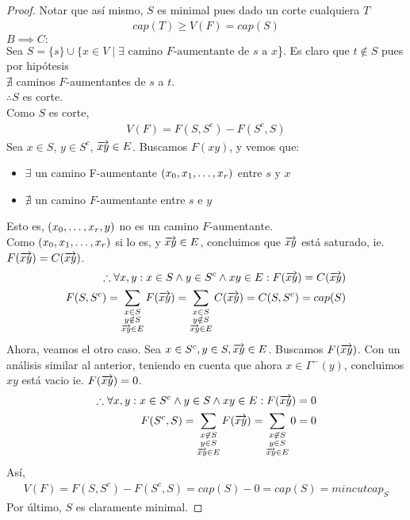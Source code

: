 \begin{proof}
  Notar que así mismo, $S$ es minimal pues dado un corte cualquiera $T$\begin{align}
    cap(T) \ge V(F) = cap(S)
  \end{align}
  $B \implies C:$\\
  Sea $S = \{s\} \cup \{x \in V \mid \exists \text{ camino $F$-aumentante de $s$ a $x$}$\}.
  Es claro que $t \notin S$ pues por hipótesis \\$\nexists$ caminos $F$-aumentantes de $s$ a $t$.\\
  $\therefore S$ es corte.\\
  Como $S$ es corte,
  \begin{align}
    V(F) = F(S, S^c) - F(S^c, S)
  \end{align}
  Sea $x \in S$, $y \in S^c$, $\overrightarrow{xy} \in E$. Buscamos $F(xy)$, y vemos que:
  \begin{itemize}
  \item $\exists$ un camino F-aumentante $(x_0, x_1,\mathellipsis, x_r)$ entre $s$ y $x$
  \item $\nexists$ un camino $F$-aumentante entre $s$ e $y$
  \end{itemize}
  Esto es, $(x_0, \mathellipsis, x_r, y)$ no es un camino $F$-aumentante.\\
  Como $(x_0, x_1, \mathellipsis, x_r)$ si lo es, y $\overrightarrow{xy} \in E$, concluimos que $\overrightarrow{xy}$ está saturado, ie. \\$F(\overrightarrow{xy}) = C(\overrightarrow{xy})$.
  \begin{align}
    \therefore \forall x,y: x \in S \wedge y \in S^c \wedge xy \in E : F(\overrightarrow{xy}) = C(\overrightarrow{xy})\\
    F(S, S^c) = \sum_{\substack{x\in S\\ y \notin S \\\overrightarrow{xy} \in E}} F(\overrightarrow{xy}) = \sum_{\substack{x\in S\\ y \notin S\\ \overrightarrow{xy} \in E}} C(\overrightarrow{xy}) = C(S, S^c) = cap(S)\\
  \end{align}
  Ahora, veamos el otro caso. Sea $x \in S^c, y \in S, \overrightarrow{xy} \in E$. Buscamos $F(\overrightarrow{xy})$. Con un análisis similar al anterior, teniendo en cuenta que ahora $x\in \Gamma^-(y)$, concluimos $xy$ está vacio ie. $F(\overrightarrow{xy}) = 0$.
  \begin{align}
    \therefore \forall x, y : x \in S^c \wedge y \in S \wedge xy \in E : F(\overrightarrow{xy}) = 0\\
    F(S^c, S) = \sum_{\substack{x\not\in S\\ y \in S\\ \overrightarrow{xy} \in E}} F(\overrightarrow{xy}) = \sum_{\substack{x\not\in S\\ y \in S\\ \overrightarrow{xy} \in E}} 0 = 0
  \end{align}
  Así,
  \begin{align}
    V(F) = F(S, S^c) - F(S^c, S) = cap(S) - 0 = cap(S) = mincutcap_S
  \end{align}
  Por último, $S$ es claramente minimal.
  

\end{proof}
